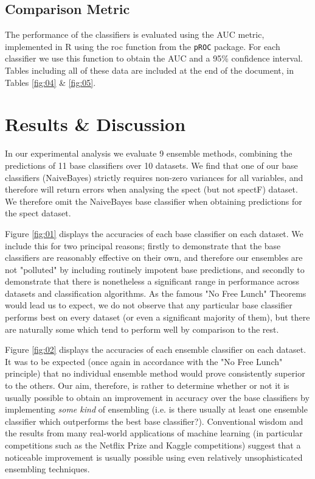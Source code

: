 \documentclass{bioinfo}
\begin{document}
\begin{methods}
\subsection{Comparison Metric}

The performance of the classifiers is evaluated using the AUC metric, implemented in R using the roc function from the \texttt{pROC} package. For each classifier we use this function to obtain the AUC and a 95\% confidence interval. Tables including all of these data are included at the end of the document, in Tables \ref{fig:04} \& \ref{fig:05}.

\end{methods}



\section{Results \& Discussion}
\label{results&discussion}

In our experimental analysis we evaluate 9 ensemble methods, combining the predictions of 11 base classifiers over 10 datasets. We find that one of our base classifiers (NaiveBayes) strictly requires non-zero variances for all variables, and therefore will return errors when analysing the spect (but not spectF) dataset. We therefore omit the NaiveBayes base classifier when obtaining predictions for the spect dataset.

\noindent
Figure \ref{fig:01} displays the accuracies of each base classifier on each dataset. We include this for two principal reasons; firstly to demonstrate that the base classifiers are reasonably effective on their own, and therefore our ensembles are not "polluted" by including routinely impotent base predictions, and secondly to demonstrate that there is nonetheless a significant range in performance across datasets and classification algorithms. As the famous "No Free Lunch" Theorems would lead us to expect, we do not observe that any particular base classifier performs best on every dataset (or even a significant majority of them), but there are naturally some which tend to perform well by comparison to the rest.

\noindent
Figure \ref{fig:02} displays the accuracies of each ensemble classifier on each dataset. It was to be expected (once again in accordance with the "No Free Lunch" principle) that no individual ensemble method would prove consistently superior to the others. Our aim, therefore, is rather to determine whether or not it is usually possible to obtain an improvement in accuracy over the base classifiers by implementing \emph{some kind} of ensembling (i.e. is there usually at least one ensemble classifier which outperforms the best base classifier?). Conventional wisdom and the results from many real-world applications of machine learning (in particular competitions such as the Netflix Prize\cite{netflixprize} and Kaggle competitions\cite{kagglecompetitions}) suggest that a noticeable improvement is usually possible using even relatively unsophisticated ensembling techniques.
\end{document}
